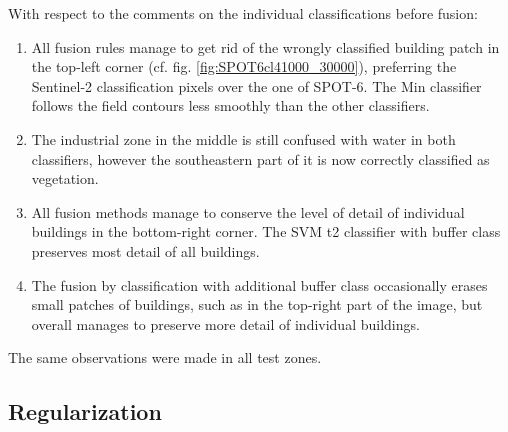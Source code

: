 \documentclass[10pt]{article}
\newcommand{\tile}{41000_30000}
\begin{document}
With respect to the comments on the individual classifications before fusion:
\begin{enumerate}
    \item All fusion rules manage to get rid of the wrongly classified building patch in the top-left corner (cf. fig. \ref{fig:SPOT6cl\tile}), preferring the Sentinel-2 classification pixels over the one of SPOT-6. The Min classifier follows the field contours less smoothly than the other classifiers.
    \item The industrial zone in the middle is still confused with water in both classifiers, however the southeastern part of it is now correctly classified as vegetation.
    \item All fusion methods manage to conserve the level of detail of individual buildings in the bottom-right corner. The SVM t2 classifier with buffer class preserves most detail of all buildings.
    \item The fusion by classification with additional buffer class occasionally erases small patches of buildings, such as in the top-right part of the image, but overall manages to preserve more detail of individual buildings.
\end{enumerate}
The same observations were made in all test zones.
\subsection{Regularization}
\end{document}
